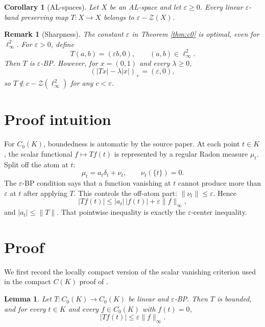 \documentclass[11pt]{article}
\newtheorem{corollary}{Corollary}
\newtheorem{lemma}{Lemma}
\newtheorem{remark}{Remark}
\newcommand{\eps}{\varepsilon}
\newcommand{\Z}{\mathcal Z}
\begin{document}
\begin{corollary}[AL-spaces]
\label{cor:al}
Let \(X\) be an AL-space and let \(\eps\ge0\). Every linear
\(\eps\)-band preserving map \(T:X\to X\) belongs to \(\eps-\Z(X)\).
\end{corollary}

\begin{remark}[Sharpness]
\label{rem:sharp}
The constant \(\eps\) in Theorem \ref{thm:c0} is optimal, even for
\(\ell_\infty^2\). For \(\eps>0\), define
\[
 T(a,b)=(\eps b,0),\qquad (a,b)\in \ell_\infty^2.
\]
Then \(T\) is \(\eps\)-BP. However, for \(x=(0,1)\) and every
\(\lambda\ge0\),
\[
 (|Tx|-\lambda |x|)_+=(\eps,0),
\]
so \(T\notin c-\Z(\ell_\infty^2)\) for any \(c<\eps\).
\end{remark}

\section*{Proof intuition}

For \(C_0(K)\), boundedness is automatic by the source paper. At each
point \(t\in K\), the scalar functional \(f\mapsto Tf(t)\) is represented by
a regular Radon measure \(\mu_t\). Split off the atom at \(t\):
\[
 \mu_t=a_t\delta_t+\nu_t,\qquad \nu_t(\{t\})=0.
\]
The \(\eps\)-BP condition says that a function vanishing at \(t\) cannot
produce more than \(\eps\) at \(t\) after applying \(T\). This controls the
off-atom part: \(\|\nu_t\|\le\eps\). Hence
\[
 |Tf(t)|\le |a_t|\,|f(t)|+\eps\|f\|_\infty,
\]
and \(|a_t|\le\|T\|\). That pointwise inequality is exactly the
\(\eps\)-center inequality.

\section*{Proof}

We first record the locally compact version of the scalar vanishing criterion
used in the compact \(C(K)\) proof of \cite[Lemma 6.1]{OT}.

\begin{lemma}
\label{lem:vanish-at-point}
Let \(T:C_0(K)\to C_0(K)\) be linear and \(\eps\)-BP. Then \(T\) is bounded,
and for every \(t\in K\) and every \(f\in C_0(K)\) with \(f(t)=0\),
\[
 |Tf(t)|\le \eps\|f\|_\infty .
\]
\end{lemma}
\end{document}
